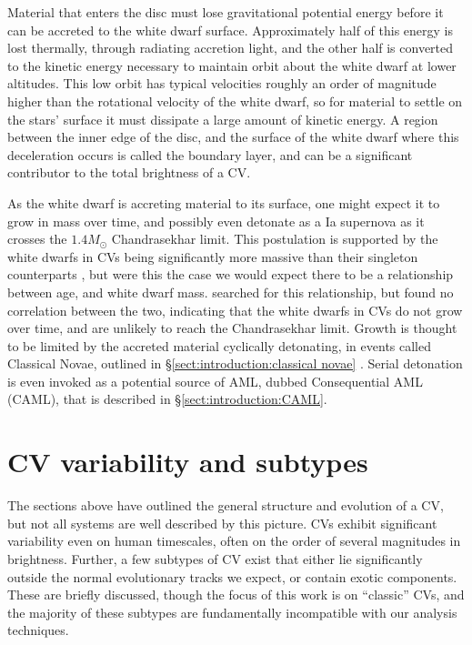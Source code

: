 Material that enters the disc must lose gravitational potential energy before it can be accreted to the white dwarf surface. Approximately half of this energy is lost thermally, through radiating accretion light, and the other half is converted to the kinetic energy necessary to maintain orbit about the white dwarf at lower altitudes. This low orbit has typical velocities roughly an order of magnitude higher than the rotational velocity of the white dwarf, so for material to settle on the stars' surface it must dissipate a large amount of kinetic energy. A region between the inner edge of the disc, and the surface of the white dwarf where this deceleration occurs is called the boundary layer, and can be a significant contributor to the total brightness of a CV. 

As the white dwarf is accreting material to its surface, one might expect it to grow in mass over time, and possibly even detonate as a Ia supernova as it crosses the $1.4 M_\odot$ Chandrasekhar limit. This postulation is supported by the white dwarfs in CVs being significantly more massive than their singleton counterparts , but were this the case we would expect there to be a relationship between age, and white dwarf mass. \citet{McAllister2019} searched for this relationship, but found no correlation between the two, indicating that the white dwarfs in CVs do not grow over time, and are unlikely to reach the Chandrasekhar limit. Growth is thought to be limited by the accreted material cyclically detonating, in events called Classical Novae, outlined in \S\ref{sect:introduction:classical novae} \citep{Wijnen2015,sparks2021}. Serial detonation is even invoked as a potential source of AML, dubbed Consequential AML (CAML), that is described in \S\ref{sect:introduction:CAML}.


\section{CV variability and subtypes}
The sections above have outlined the general structure and evolution of a CV, but not all systems are well described by this picture. CVs exhibit significant variability even on human timescales, often on the order of several magnitudes in brightness. Further, a few subtypes of CV exist that either lie significantly outside the normal evolutionary tracks we expect, or contain exotic components. These are briefly discussed, though the focus of this work is on ``classic'' CVs, and the majority of these subtypes are fundamentally incompatible with our analysis techniques.

